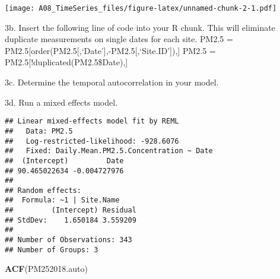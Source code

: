 \documentclass[]{article}
\newenvironment{Shaded}{\begin{snugshade}}{\end{snugshade}}
\newcommand{\KeywordTok}[1]{\textcolor[rgb]{0.13,0.29,0.53}{\textbf{#1}}}
\newcommand{\DataTypeTok}[1]{\textcolor[rgb]{0.13,0.29,0.53}{#1}}
\newcommand{\DecValTok}[1]{\textcolor[rgb]{0.00,0.00,0.81}{#1}}
\newcommand{\FloatTok}[1]{\textcolor[rgb]{0.00,0.00,0.81}{#1}}
\newcommand{\StringTok}[1]{\textcolor[rgb]{0.31,0.60,0.02}{#1}}
\newcommand{\CommentTok}[1]{\textcolor[rgb]{0.56,0.35,0.01}{\textit{#1}}}
\newcommand{\OperatorTok}[1]{\textcolor[rgb]{0.81,0.36,0.00}{\textbf{#1}}}
\newcommand{\NormalTok}[1]{#1}
\begin{document}
\texttt{[image: A08\_TimeSeries\_files/figure-latex/unnamed-chunk-2-1.pdf]}

3b. Insert the following line of code into your R chunk. This will
eliminate duplicate measurements on single dates for each site. PM2.5 =
PM2.5{[}order(PM2.5{[},`Date'{]},-PM2.5{[},`Site.ID'{]}),{]} PM2.5 =
PM2.5{[}!duplicated(PM2.5\$Date),{]}

3c. Determine the temporal autocorrelation in your model.

3d. Run a mixed effects model.

\begin{Shaded}
\end{Shaded}

\begin{verbatim}
## Linear mixed-effects model fit by REML
##   Data: PM2.5 
##   Log-restricted-likelihood: -928.6076
##   Fixed: Daily.Mean.PM2.5.Concentration ~ Date 
##  (Intercept)         Date 
## 90.465022634 -0.004727976 
## 
## Random effects:
##  Formula: ~1 | Site.Name
##         (Intercept) Residual
## StdDev:    1.650184 3.559209
## 
## Number of Observations: 343
## Number of Groups: 3
\end{verbatim}

\begin{Shaded}
\begin{Highlighting}[]
\KeywordTok{ACF}\NormalTok{(PM252018.auto)}
\end{Highlighting}
\end{Shaded}
\end{document}
